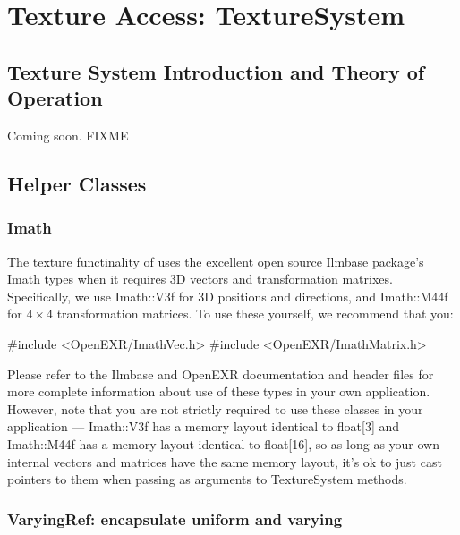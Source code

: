 \chapter{Texture Access: {\cf TextureSystem}}
\label{chap:texturesystem}

\def\TextureSystem{{\kw TextureSystem}\xspace}
\def\TextureOptions{{\kw TextureOptions}\xspace}


\section{Texture System Introduction and Theory of Operation}
\label{sec:texturesys:intro}

Coming soon.
FIXME

\section{Helper Classes}
\label{sec:texturesys:helperclasses}

\subsection{Imath}

The texture functinality of \product uses the excellent open source
{\cf Ilmbase} package's {\cf Imath} types when it requires 3D vectors
and transformation matrixes.  Specifically, we use {\cf Imath::V3f}
for 3D positions and directions, and {\cf Imath::M44f} for $4 \times 4$
transformation matrices.  To use these yourself, we recommend that you:

\begin{code}
    #include <OpenEXR/ImathVec.h>
    #include <OpenEXR/ImathMatrix.h>
\end{code}

Please refer to the {\cf Ilmbase} and {\cf OpenEXR}
documentation and header files for more complete information about
use of these types in your own application.  However, note that you
are not strictly required to use these classes in your application ---
{\cf Imath::V3f} has a memory layout identical to {\cf float[3]}
and {\cf Imath::M44f} has a memory layout identical to {\cf float[16]},
so as long as your own internal vectors and matrices have the same
memory layout, it's ok to just cast pointers to them when passing
as arguments to \TextureSystem methods.

\subsection{{\cf VaryingRef}: encapsulate uniform and varying}


